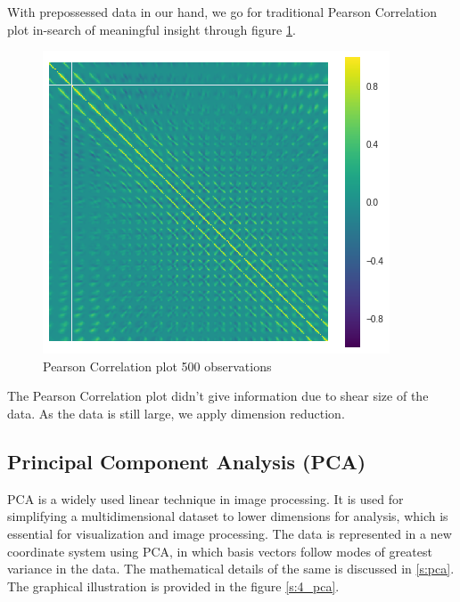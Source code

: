 With prepossessed data in our hand, we go for traditional Pearson Correlation plot in-search of meaningful insight through figure \ref{4_3}.

\begin{figure}[h!]
\begin{center}
\includegraphics[width=\textwidth]{./Figures/4_3.png}
\caption {Pearson Correlation plot 500 observations}
\label{4_3} 
\end{center}
\end{figure}

The Pearson Correlation plot didn't give information due to shear size of the data. As the data is still large, we apply dimension reduction.

\subsection{Principal Component Analysis (PCA)}
PCA is a widely used linear technique in image processing. It is used for simplifying a multidimensional dataset to lower dimensions for analysis, which is essential for visualization and image processing. The data is represented in a new coordinate system using PCA, in which basis vectors
follow modes of greatest variance in the data. The mathematical details of the same is discussed in \ref{s:pca}. The graphical illustration is provided in the figure \ref{s:4_pca}.

